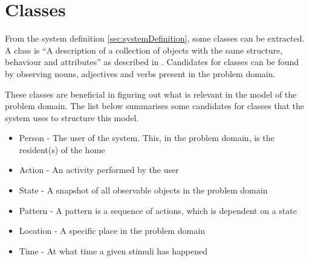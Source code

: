 \section{Classes}\label{sec:classes}
From the system definition \cref{sec:systemDefinition}, some classes can be extracted. A class is \enquote{A description of a collection of objects with the same structure, behaviour and attributes} as described in \cite{OOAD}. Candidates for classes can be found by observing nouns, adjectives and verbs present in the problem domain.

These classes are beneficial in figuring out what is relevant in the model of the problem domain. The list below summarises some candidates for classes that the system uses to structure this model.

\begin{itemize}
\item Person - The user of the system. This, in the problem domain, is the resident(s) of the home
\item Action - An activity performed by the user
\item State - A snapshot of all observable objects in the problem domain
\item Pattern - A pattern is a sequence of actions, which is dependent on a state
\item Location - A specific place in the problem domain
\item Time - At what time a given stimuli has happened
\end{itemize}
